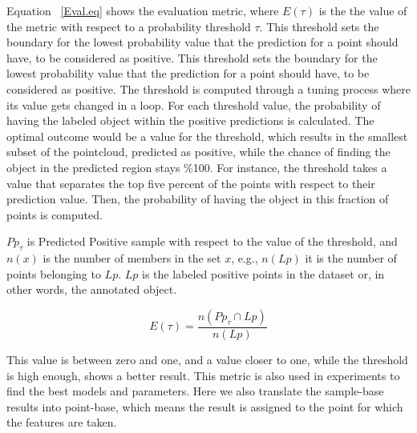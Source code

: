 Equation ~\ref{Eval.eq} shows the evaluation metric, where $E(\tau)$ is the the value of the metric with respect to a 
probability threshold $\tau$. 
This threshold sets the boundary for the lowest probability value that the prediction for a point should have, to be 
considered as positive. 
This threshold sets the boundary for the lowest probability value that the prediction for a point should have, to be considered as positive. 
The threshold is computed through a tuning process where its value gets changed in a loop. For each threshold value, the probability of having the labeled object within the positive predictions is calculated. The optimal outcome would be a value for the threshold, which results in the smallest subset of the pointcloud, predicted as positive, while the chance of finding the object in the predicted region stays \%100. For instance, the threshold takes a value that separates the top five percent of the points with respect to their prediction value. Then, the probability of having the object in this fraction of points is computed.


$Pp_{\tau}$ is Predicted Positive sample with respect to the value of the threshold, and $n(x)$ is the number of 
members in the set $x$, e.g., $n(Lp)$ it is the number of points belonging to $Lp$. $Lp$ is the 
labeled positive points in the dataset or, in other words, the annotated object.

\begin{equation}
 \label{Eval.eq}
    E(\tau) = \frac{n({Pp_{\tau}} \cap {Lp})}{n(Lp)} 
\end{equation}

This value is between zero and one, and a value closer to one, while the threshold is high enough, shows a better result.
This metric is also used in experiments to find the best models and parameters. 
Here we also translate the sample-base results into point-base, which means the result is assigned to the point for which 
the features are taken.


